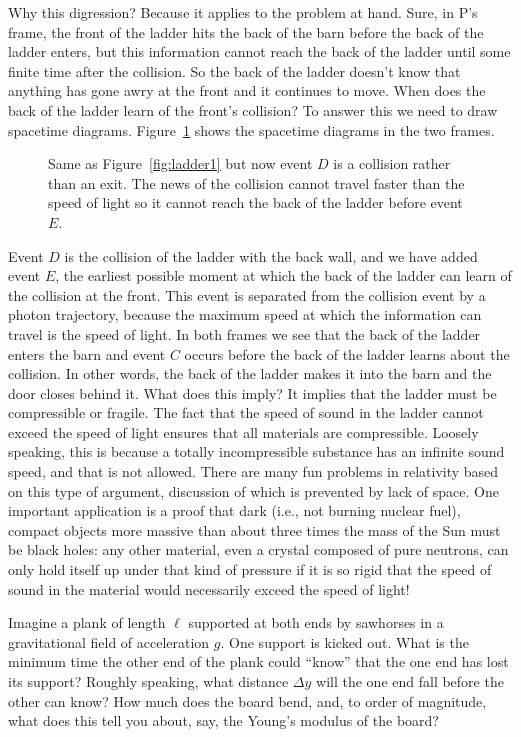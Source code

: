 Why this digression?  Because it applies to the problem at hand.
Sure, in P's frame, the front of the ladder hits the back of the barn
before the back of the ladder enters, but this information cannot
reach the back of the ladder until some finite time after the
collision.  So the back of the ladder doesn't know that anything has
gone awry at the front and it continues to move.  When does the back
of the ladder learn of the front's collision?  To answer this we need
to draw spacetime diagrams.  Figure~\ref{fig:ladder2} shows the
spacetime diagrams in the two frames.
\begin{figure}
\caption[The ladder and barn revisited]{Same as
Figure~\ref{fig:ladder1} but now event $D$ is a collision rather than
an exit.  The news of the collision cannot travel faster than the
speed of light so it cannot reach the back of the ladder before event
$E$.}
\label{fig:ladder2}
\end{figure}
Event $D$ is the collision of the ladder with the back wall, and we
have added event $E$, the earliest possible moment at which the back
of the ladder can learn of the collision at the front.  This event is
separated from the collision event by a photon trajectory, because the
maximum speed at which the information can travel is the speed of
light.  In both frames we see that the back of the ladder enters the
barn and event $C$ occurs before the back of the ladder learns about
the collision.  In other words, the back of the ladder makes it into
the barn and the door closes behind it.  What does this imply?  It
implies that the ladder must be compressible or fragile.  The fact
that the speed of sound in the ladder cannot exceed the speed of light
ensures that all materials are compressible.  Loosely speaking, this
is because a totally incompressible substance has an infinite sound
speed, and that is not allowed.  There are many fun problems in
relativity based on this type of argument, discussion of which is
prevented by lack of space.  One important application is a proof that
dark (i.e., not burning nuclear fuel), compact objects more massive
than about three times the mass of the Sun must be black holes: any
other material, even a crystal composed of pure neutrons, can only
hold itself up under that kind of pressure if it is so rigid that the
speed of sound in the material would necessarily exceed the speed of
light!

\begin{problem}
Imagine a plank of length $\ell$ supported at both ends by sawhorses
in a gravitational field of acceleration $g$.  One support is kicked
out.  What is the minimum time the other end of the plank could
``know'' that the one end has lost its support?  Roughly speaking,
what distance $\Delta y$ will the one end fall before the other can
know?  How much does the board bend, and, to order of magnitude, what
does this tell you about, say, the Young's modulus of the board?
\end{problem}

